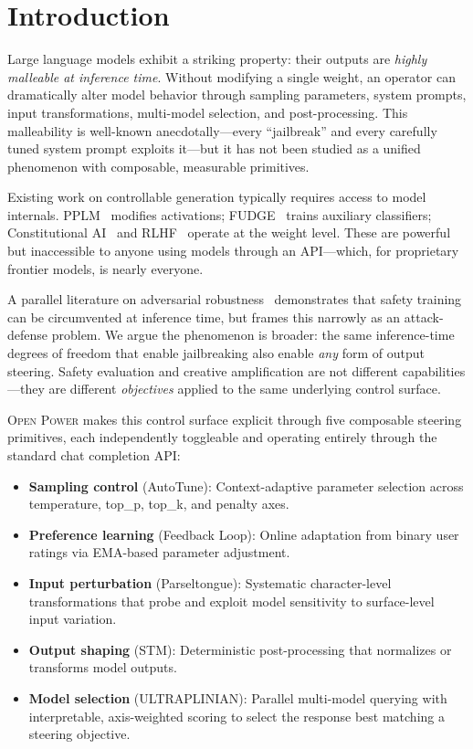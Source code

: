 \documentclass[11pt]{article}
\begin{document}
\section{Introduction}

Large language models exhibit a striking property: their outputs are \emph{highly malleable at inference time}. Without modifying a single weight, an operator can dramatically alter model behavior through sampling parameters, system prompts, input transformations, multi-model selection, and post-processing. This malleability is well-known anecdotally---every ``jailbreak'' and every carefully tuned system prompt exploits it---but it has not been studied as a unified phenomenon with composable, measurable primitives.

Existing work on controllable generation typically requires access to model internals. PPLM~\cite{dathathri2020plug} modifies activations; FUDGE~\cite{yang2021fudge} trains auxiliary classifiers; Constitutional AI~\cite{bai2022constitutional} and RLHF~\cite{ouyang2022training} operate at the weight level. These are powerful but inaccessible to anyone using models through an API---which, for proprietary frontier models, is nearly everyone.

A parallel literature on adversarial robustness~\cite{zou2023universal,wei2023jailbroken,chao2023jailbreaking} demonstrates that safety training can be circumvented at inference time, but frames this narrowly as an attack-defense problem. We argue the phenomenon is broader: the same inference-time degrees of freedom that enable jailbreaking also enable \emph{any} form of output steering. Safety evaluation and creative amplification are not different capabilities---they are different \emph{objectives} applied to the same underlying control surface.

\textsc{Open Power} makes this control surface explicit through five composable steering primitives, each independently toggleable and operating entirely through the standard chat completion API:

\begin{itemize}
    \item \textbf{Sampling control} (AutoTune): Context-adaptive parameter selection across temperature, top\_p, top\_k, and penalty axes.
    \item \textbf{Preference learning} (Feedback Loop): Online adaptation from binary user ratings via EMA-based parameter adjustment.
    \item \textbf{Input perturbation} (Parseltongue): Systematic character-level transformations that probe and exploit model sensitivity to surface-level input variation.
    \item \textbf{Output shaping} (STM): Deterministic post-processing that normalizes or transforms model outputs.
    \item \textbf{Model selection} (ULTRAPLINIAN): Parallel multi-model querying with interpretable, axis-weighted scoring to select the response best matching a steering objective.
\end{itemize}
\end{document}
